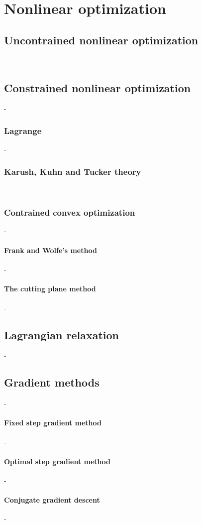 \documentclass[12pt,openany,oneside]{book}
\theoremstyle{definition}
\numberwithin{definition}{section}
\numberwithin{theorem}{section}
\numberwithin{corollary}{section}
\numberwithin{proposition}{section}
\numberwithin{notation}{section}
\numberwithin{remark}{section}
\numberwithin{hypothesis}{section}
\numberwithin{example}{section}
\begin{document}
\chapter{Nonlinear optimization}

\section{Uncontrained nonlinear optimization}-
\section{Constrained nonlinear optimization}-
\subsection{Lagrange}-
\subsection{Karush, Kuhn and Tucker theory}-
\subsection{Contrained convex optimization}-
\subsubsection{Frank and Wolfe's method}-
\subsubsection{The cutting plane method}-
\section{Lagrangian relaxation}-
\section{Gradient methods}-
\subsubsection{Fixed step gradient method}-
\subsubsection{Optimal step gradient method}-
\subsubsection{Conjugate gradient descent}-
\end{document}
